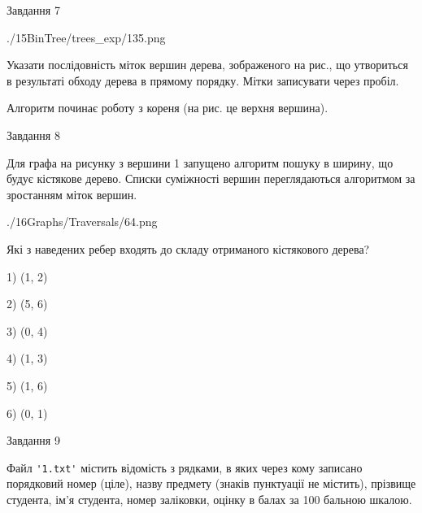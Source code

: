 \documentclass[12pt, ukrainian]{article}
\def\code#1{\Verb!#1!}
\begin{document}
{\vspace{10mm}\par

\newpage
\begin{minipage}[t]{9.7cm}
               
{\begin{center}Завдання {7}\end{center}}
\vspace{-6mm}

\begin{center}
	{./15BinTree/trees_exp/135.png}
\end{center}
Указати послідовність міток вершин дерева, зображеного на рис., що утвориться в результаті обходу дерева в прямому порядку. Мітки записувати через пробіл.\par Алгоритм починає роботу з кореня (на рис. це верхня вершина).\par

\end{minipage}
\vline \hspace{8mm}
\begin{minipage}[t]{8.0cm}
               
{\begin{center}Завдання {8}\end{center}}
\vspace{-6mm}
Для графа на рисунку з вершини 1 запущено алгоритм пошуку в ширину, що будує кістякове дерево. Списки суміжності вершин переглядаються алгоритмом за зростанням міток вершин.\par
\begin{center}
	{./16Graphs/Traversals/64.png}
\end{center}
\par Які з наведених ребер входять до складу отриманого кістякового дерева?\par
1) (1, 2)\par
2) (5, 6)\par
3) (0, 4)\par
4) (1, 3)\par
5) (1, 6)\par
6) (0, 1)\par
{\vskip 15pt} \par

\end{minipage}

               
{\begin{center}Завдання {9}\end{center}}
\vspace{-6mm}
Файл \code{'1.txt'} містить відомість з рядками, в яких через кому записа\-но поряд\-ковий номер (ціле), назву предмету (знаків пунктуації не містить), прізвище студента, ім'я студента, номер заліковки, оцінку в балах за 100 бальною шкалою.

}
\end{document}

